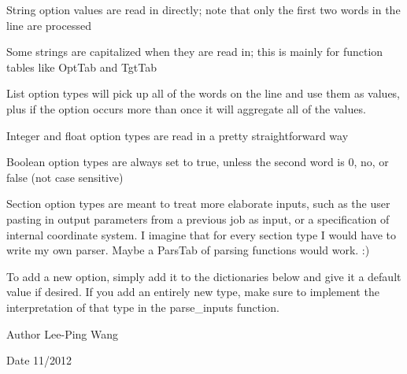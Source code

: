 \begin{DoxyItemize}
\item String option values are read in directly; note that only the first two words in the line are processed
\item Some strings are capitalized when they are read in; this is mainly for function tables like Opt\+Tab and Tgt\+Tab
\item List option types will pick up all of the words on the line and use them as values, plus if the option occurs more than once it will aggregate all of the values.
\item Integer and float option types are read in a pretty straightforward way
\item Boolean option types are always set to true, unless the second word is \textquotesingle{}0\textquotesingle{}, \textquotesingle{}no\textquotesingle{}, or \textquotesingle{}false\textquotesingle{} (not case sensitive)
\item Section option types are meant to treat more elaborate inputs, such as the user pasting in output parameters from a previous job as input, or a specification of internal coordinate system. I imagine that for every section type I would have to write my own parser. Maybe a Pars\+Tab of parsing functions would work. \+:)
\end{DoxyItemize}

To add a new option, simply add it to the dictionaries below and give it a default value if desired. If you add an entirely new type, make sure to implement the interpretation of that type in the parse\+\_\+inputs function.

\begin{DoxyAuthor}{Author}
Lee-\/\+Ping Wang 
\end{DoxyAuthor}
\begin{DoxyDate}{Date}
11/2012 
\end{DoxyDate}
